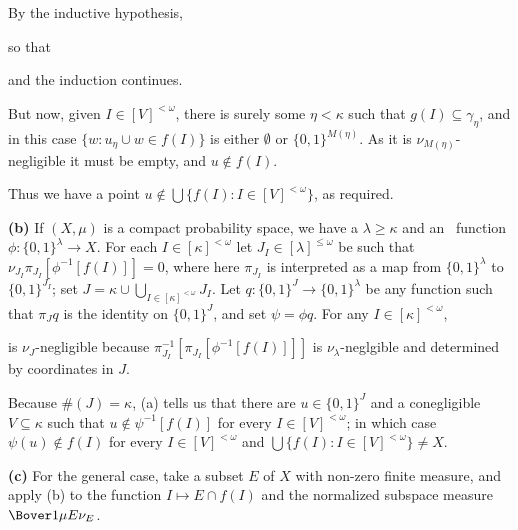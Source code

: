 {\noindent By the inductive hypothesis,


\noindent so that


\noindent and the induction continues.\ \Qed

\medskip

But now, given $I\in[V]^{<\omega}$,  there is surely some $\eta<\kappa$
such that $g(I)\subseteq\gamma_{\eta}$, and in this case
$\{w:{u_{\eta}}\cup w\in f(I)\}$ is either $\emptyset$ or
$\{0,1\}^{M(\eta)}$.   As it is $\nu_{M(\eta)}$-negligible it must be
empty, and $u\notin f(I)$.

Thus we have a point $u\notin\bigcup\{f(I):I\in[V]^{<\omega}\}$,
as required.

\medskip

{\bf (b)} If $(X,\mu)$ is a compact probability space,
we have a $\lambda\ge\kappa$ and an \imp\ function
$\phi:\{0,1\}^{\lambda}\to X$.   For each $I\in[\kappa]^{<\omega}$
let $J_I\in[\lambda]^{\le\omega}$ be such that
$\nu_{J_I}\pi_{J_I}[\phi^{-1}[f(I)]]=0$, where here
$\pi_{J_I}$ is interpreted as a
map from $\{0,1\}^{\lambda}$ to $\{0,1\}^{J_I}$;  set
$J=\kappa\cup\bigcup_{I\in[\kappa]^{<\omega}}J_I$.
Let $q:\{0,1\}^J\to\{0,1\}^{\lambda}$ be any function such that
$\pi_Jq$ is the identity on $\{0,1\}^J$, and set $\psi=\phi q$.
For any $I\in[\kappa]^{<\omega}$,


\noindent is $\nu_J$-negligible because
$\pi_{J_I}^{-1}[\pi_{J_I}[\phi^{-1}[f(I)]]]$ is $\nu_{\lambda}$-neglgible
and determined by coordinates in $J$.

Because $\#(J)=\kappa$, (a) tells us that
there are $u\in\{0,1\}^J$ and a conegligible $V\subseteq\kappa$ such that
$u\notin\psi^{-1}[f(I)]$ for every
$I\in[V]^{<\omega}$;  in which case $\psi(u)\notin f(I)$ for every
$I\in[V]^{<\omega}$ and $\bigcup\{f(I):I\in[V]^{<\omega}\}\ne X$.

\medskip

{\bf (c)} For the general case, take a subset $E$ of $X$ with non-zero
finite measure, and apply (b) to the function $I\mapsto E\cap f(I)$ and
the normalized subspace measure $\Bover1{\mu E}\nu_E$.
}%

